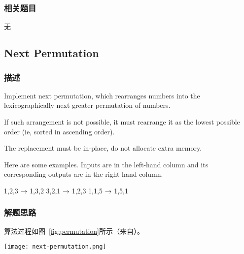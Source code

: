 \subsubsection{相关题目}
\begindot
\item 无
\myenddot


\subsection{Next Permutation} %
\label{sec:next-permutation}


\subsubsection{描述}
Implement next permutation, which rearranges numbers into the lexicographically 
next greater permutation of numbers.

If such arrangement is not possible, it must rearrange it as the lowest 
possible order (ie, sorted in ascending order).

The replacement must be in-place, do not allocate extra memory.

Here are some examples. Inputs are in the left-hand column and its 
corresponding outputs are in the right-hand column.
\begin{Code}
	1,2,3 → 1,3,2
	3,2,1 → 1,2,3
	1,1,5 → 1,5,1
\end{Code}


\subsubsection{解题思路}
算法过程如图~\ref{fig:permutation}所示（来自）。

\begin{center}
	\texttt{[image: next-permutation.png]}\\
	\label{fig:permutation}
\end{center}


